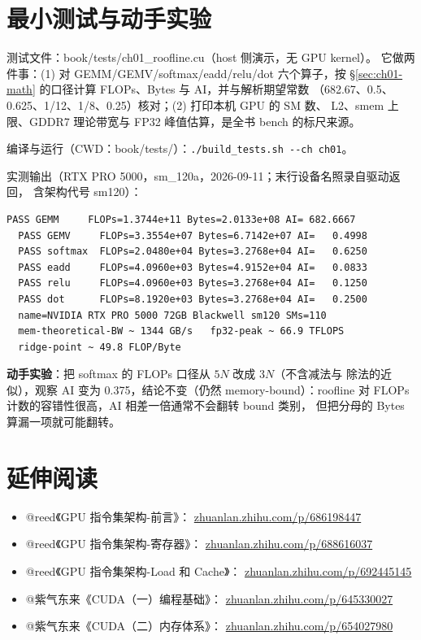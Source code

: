 \section{最小测试与动手实验}\label{sec:ch01-test}

测试文件：book/tests/ch01\_roofline.cu（host 侧演示，无 GPU kernel）。
它做两件事：(1) 对 GEMM/GEMV/softmax/eadd/relu/dot 六个算子，按
\S\ref{sec:ch01-math} 的口径计算 FLOPs、Bytes 与 AI，并与解析期望常数
（682.67、0.5、0.625、1/12、1/8、0.25）核对；(2) 打印本机 GPU 的 SM 数、
L2、smem 上限、GDDR7 理论带宽与 FP32 峰值估算，是全书 bench 的标尺来源。

编译与运行（CWD：book/tests/）：\texttt{.\allowbreak{}/\allowbreak{}build\_\allowbreak{}tests.\allowbreak{}sh -{}-ch ch01}。

实测输出（RTX PRO 5000，sm\_120a，2026-09-11；末行设备名照录自驱动返回，
含架构代号 sm120）：
\begin{lstlisting}[style=console]
  PASS GEMM     FLOPs=1.3744e+11 Bytes=2.0133e+08 AI= 682.6667
  PASS GEMV     FLOPs=3.3554e+07 Bytes=6.7142e+07 AI=   0.4998
  PASS softmax  FLOPs=2.0480e+04 Bytes=3.2768e+04 AI=   0.6250
  PASS eadd     FLOPs=4.0960e+03 Bytes=4.9152e+04 AI=   0.0833
  PASS relu     FLOPs=4.0960e+03 Bytes=3.2768e+04 AI=   0.1250
  PASS dot      FLOPs=8.1920e+03 Bytes=3.2768e+04 AI=   0.2500
  name=NVIDIA RTX PRO 5000 72GB Blackwell sm120 SMs=110
  mem-theoretical-BW ~ 1344 GB/s   fp32-peak ~ 66.9 TFLOPS
  ridge-point ~ 49.8 FLOP/Byte
\end{lstlisting}

\textbf{动手实验}：把 softmax 的 FLOPs 口径从 $5N$ 改成 $3N$（不含减法与
除法的近似），观察 AI 变为 0.375，结论不变（仍然 memory-bound）：roofline
对 FLOPs 计数的容错性很高，AI 相差一倍通常不会翻转 bound 类别，
但把分母的 Bytes 算漏一项就可能翻转。

\section*{延伸阅读}
\begin{itemize}
\item @reed《GPU 指令集架构-前言》：
  \href{https://zhuanlan.zhihu.com/p/686198447}{zhuanlan.zhihu.com/p/686198447}
\item @reed《GPU 指令集架构-寄存器》：
  \href{https://zhuanlan.zhihu.com/p/688616037}{zhuanlan.zhihu.com/p/688616037}
\item @reed《GPU 指令集架构-Load 和 Cache》：
  \href{https://zhuanlan.zhihu.com/p/692445145}{zhuanlan.zhihu.com/p/692445145}
\item @紫气东来《CUDA（一）编程基础》：
  \href{https://zhuanlan.zhihu.com/p/645330027}{zhuanlan.zhihu.com/p/645330027}
\item @紫气东来《CUDA（二）内存体系》：
  \href{https://zhuanlan.zhihu.com/p/654027980}{zhuanlan.zhihu.com/p/654027980}
\end{itemize}
